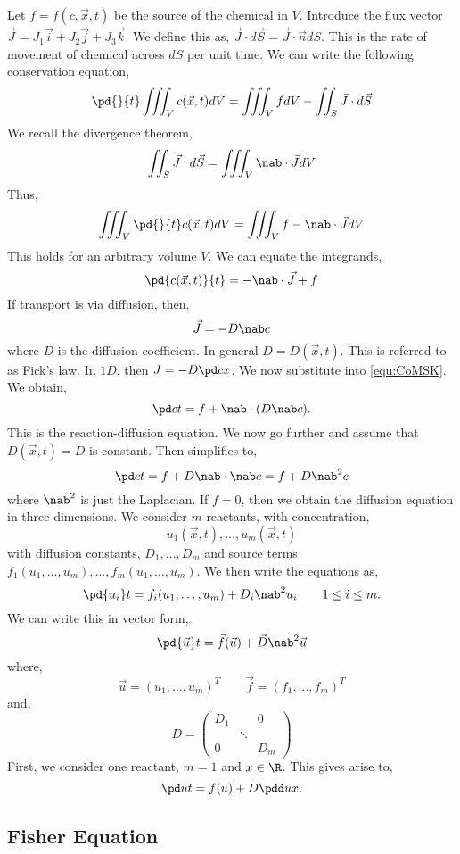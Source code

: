 \noindent
Let $f = f(c, \vec x, t)$ be the source of the chemical in $V$. Introduce the flux vector $\vec J = J_1\vec i + J_2\vec j + J_3\vec k$. We define this as, $\vec J \cdot d\vec S = \vec J \cdot \vec n dS$. This is the rate of movement of chemical across $dS$ per unit time. We can write the following conservation equation,
$$ \pd{}{t} \iiint_V c(\vec x, t) dV = \iiint_V fdV - \iint_S \vec J \cdot d\vec S $$
We recall the divergence theorem,
$$ \iint_S \vec J \cdot d\vec S = \iiint_V \nab \cdot \vec J dV $$
Thus,
$$ \iiint_V \pd{}{t} c(\vec x, t) dV = \iiint_V f - \nab \cdot \vec J dV $$
This holds for an arbitrary volume $V$. We can equate the integrands,
\begin{equation}
  \pd {c(\vec x, t)}{t} = -\nab \cdot \vec J + f \label{equ:CoMSK}
\end{equation}
If transport is via diffusion, then,
$$ \vec J = -D\nab c $$
where $D$ is the diffusion coefficient. In general $D = D(\vec x, t)$. This is referred to as Fick's law. In $1D$, then $J = -D\pd c x$. We now substitute into \ref{equ:CoMSK}. We obtain,
\begin{equation}
  \pd c t = f + \nab \cdot (D \nab c).\label{equ:RD}
\end{equation}
This is the reaction-diffusion equation. We now go further and assume that $D(\vec x, t) = D$ is constant. Then  simplifies to,
\begin{equation}
  \pd c t = f + D\nab \cdot \nab c = f + D\nab^2 c\label{equ:simpRD}
\end{equation}
where $\nab^2$ is just the Laplacian. If $f = 0$, then we obtain the diffusion equation in three dimensions. We consider $m$ reactants, with concentration,
$$ u_1(\vec x, t), \dots, u_m(\vec x, t) $$
with diffusion constants, $ D_1, \dots, D_m$ and source terms $f_1(u_1, \dots, u_m), \dots, f_m(u_1, \dots, u_m)$. We then write the equations as,
$$ \pd {u_i} t = f_i(u_1, \dots, u_m) + D_i \nab^2 u_i \qquad 1 \le i \le m. $$
We can write this in vector form,
$$ \pd {\vec u} t = \vec f(\vec u) + \vec D\nab^2 \vec u $$
where,
$$ \vec u = (u_1, \dots, u_m)^T \qquad \vec f = (f_1, \dots, f_m)^T $$
and,
$$ D = \begin{pmatrix}
  D_1 & & 0 \\
  & \ddots & \\
  0 & & D_m
\end{pmatrix} $$
First, we consider one reactant, $m = 1$ and $x \in \R$. This gives arise to,
$$ \pd u t = f(u) + D\pdd u x. $$
\subsection{Fisher Equation}

